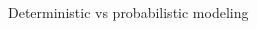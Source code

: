 \documentclass[10pt,aspectratio=169]{beamer}
\begin{document}
\begin{frame}[t]{Deterministic vs probabilistic modeling}
{\begin{columns}[T]
    \begin{column}{0.5\textwidth}	


\end{column}
\end{columns}}
\end{frame}
\end{document}
